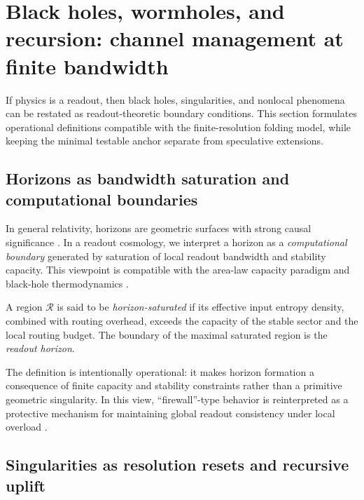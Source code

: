 
\section{Black holes, wormholes, and recursion: channel management at finite bandwidth}
\label{sec:blackholes_recursion}

If physics is a readout, then black holes, singularities, and nonlocal phenomena can be restated as readout-theoretic boundary conditions.
This section formulates operational definitions compatible with the finite-resolution folding model, while keeping the minimal testable anchor separate from speculative extensions.

\subsection{Horizons as bandwidth saturation and computational boundaries}
\label{subsec:horizon_bandwidth}

In general relativity, horizons are geometric surfaces with strong causal significance \cite{Wald1984}.
In a readout cosmology, we interpret a horizon as a \emph{computational boundary} generated by saturation of local readout bandwidth and stability capacity.
This viewpoint is compatible with the area-law capacity paradigm and black-hole thermodynamics \cite{Bekenstein1973,Hawking1975}.

\begin{definition}
\label{def:horizon_saturation}
A region $\mathcal{R}$ is said to be \emph{horizon-saturated} if its effective input entropy density, combined with routing overhead, exceeds the capacity of the stable sector and the local routing budget.
The boundary of the maximal saturated region is the \emph{readout horizon}.
\end{definition}

The definition is intentionally operational: it makes horizon formation a consequence of finite capacity and stability constraints rather than a primitive geometric singularity.
In this view, ``firewall''-type behavior is reinterpreted as a protective mechanism for maintaining global readout consistency under local overload \cite{AlmheiriMarolfPolchinskiSully2013}.

\subsection{Singularities as resolution resets and recursive uplift}
\label{subsec:singularity_reset}

